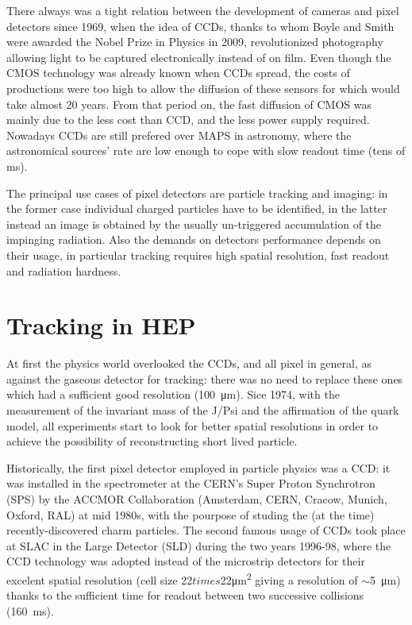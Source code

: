 There always was a tight relation between the development of cameras and pixel detectors since 1969, when the idea of CCDs, thanks to whom Boyle and Smith were awarded the Nobel Prize in Physics in 2009, revolutionized photography allowing light to be captured electronically instead of on film. 
Even though the CMOS technology was already known when CCDs spread, the costs of productions were too high to allow the diffusion of these sensors for which would take almost 20 years. From that period on, the fast diffusion of CMOS was mainly due to the less cost than CCD, and the less power supply required. Nowadays CCDs are still prefered over MAPS in astronomy, where the astronomical sources' rate are low enough to cope with slow readout time (tens of \si{ms}).  

The principal use cases of pixel detectors are particle tracking and imaging: in the former case individual charged particles have to be identified, in the latter instead an image is obtained by the usually un-triggered accumulation of the impinging radiation. 
Also the demands on detectors performance depends on their usage, in particular tracking requires high spatial resolution, fast readout and radiation hardness. 

\section{Tracking in HEP}
    At first the physics world overlooked the CCDs, and all pixel in general, as against the gaseous detector for tracking: there was no need to replace these ones which had a sufficient good resolution (\SI{100}{\um}). Sice 1974, with the measurement of the invariant mass of the J/Psi and the affirmation of the quark model, all experiments start to look for better spatial resolutions in order to achieve the possibility of reconstructing short lived particle.  

    Historically, the first pixel detector employed in particle physics was a CCD: it was installed in the spectrometer at the CERN’s Super Proton Synchrotron (SPS) by the ACCMOR Collaboration (Amsterdam, CERN, Cracow, Munich, Oxford, RAL) at mid 1980s, with the pourpose of studing the (at the time) recently-discovered charm particles.
    The second famous usage of CCDs took place at SLAC in the Large Detector (SLD) during the two years 1996-98, where the CCD technology was adopted instead of the microstrip detectors for their excelent spatial resolution (cell size 22$times$22\si{\um\squared} giving a resolution of $\sim$\SI{5}{\um}) thanks to the sufficient time for readout between two successive collisions (\SI{160}{ms}).

